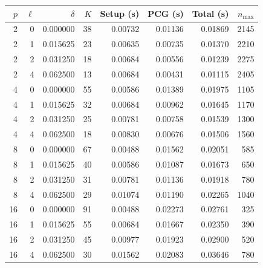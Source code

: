 \begin{tabular}{rrrrrrrr}
\toprule
$p$ & $\ell$ & $\delta$ & $K$ & Setup (s) & PCG (s) & Total (s) & $n_{\max}$ \\
\midrule
2 & 0 & 0.000000 & 38 & 0.00732 & 0.01136 & 0.01869 & 2145 \\
2 & 1 & 0.015625 & 23 & 0.00635 & 0.00735 & 0.01370 & 2210 \\
2 & 2 & 0.031250 & 18 & 0.00684 & 0.00556 & 0.01239 & 2275 \\
2 & 4 & 0.062500 & 13 & 0.00684 & 0.00431 & 0.01115 & 2405 \\
4 & 0 & 0.000000 & 55 & 0.00586 & 0.01389 & 0.01975 & 1105 \\
4 & 1 & 0.015625 & 32 & 0.00684 & 0.00962 & 0.01645 & 1170 \\
4 & 2 & 0.031250 & 25 & 0.00781 & 0.00758 & 0.01539 & 1300 \\
4 & 4 & 0.062500 & 18 & 0.00830 & 0.00676 & 0.01506 & 1560 \\
8 & 0 & 0.000000 & 67 & 0.00488 & 0.01562 & 0.02051 & 585 \\
8 & 1 & 0.015625 & 40 & 0.00586 & 0.01087 & 0.01673 & 650 \\
8 & 2 & 0.031250 & 31 & 0.00781 & 0.01136 & 0.01918 & 780 \\
8 & 4 & 0.062500 & 29 & 0.01074 & 0.01190 & 0.02265 & 1040 \\
16 & 0 & 0.000000 & 91 & 0.00488 & 0.02273 & 0.02761 & 325 \\
16 & 1 & 0.015625 & 55 & 0.00684 & 0.01667 & 0.02350 & 390 \\
16 & 2 & 0.031250 & 45 & 0.00977 & 0.01923 & 0.02900 & 520 \\
16 & 4 & 0.062500 & 30 & 0.01562 & 0.02083 & 0.03646 & 780 \\
\bottomrule
\end{tabular}
